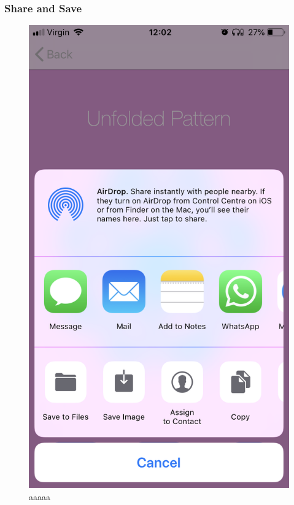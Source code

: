 \documentclass[11pt]{article}
\begin{document}
            \subsubsection{Share and Save}
            \begin{figure}[!ht]
                        \begin{minipage}{0.45\textwidth}
                            \centering \includegraphics[width=0.7\linewidth]{KiriZen/share.png}
                            \caption{aaaaa}
                            \label{fig:kiriZen-share}
                        \end{minipage}\hfill
                        \begin{minipage}{0.45\textwidth}
                            \centering

\end{minipage}
\end{figure}
\end{document}

